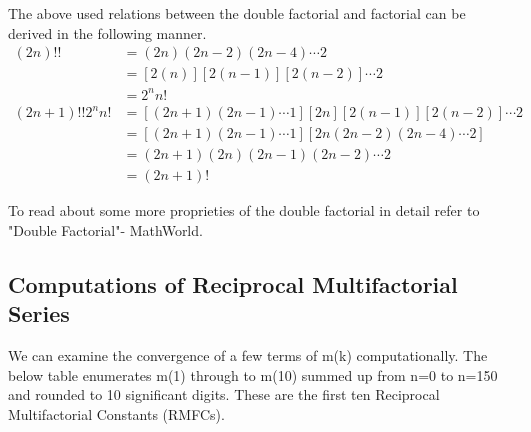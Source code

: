 \documentclass[12pt]{article}
\numberwithin{equation}{section}
\newcommand{\QED}{\tag*{$\square$}}
\begin{document}
\par
The above used relations between the double factorial and factorial can be derived in the following manner.
\begin{align*}
    (2n)!!&=(2n)(2n-2)(2n-4) \cdots 2\\
    &=[2(n)][2(n-1)][2(n-2)] \cdots 2\\
    &= 2^n n! \QED \\
    (2n+1)!!2^n n! &=[(2n+1)(2n-1)\cdots 1][2n][2(n-1)][2(n-2)]\cdots2\\
    &=[(2n+1)(2n-1) \cdots 1] [2n(2n-2)(2n-4) \cdots 2]\\
    &=(2n+1)(2n)(2n-1)(2n-2)\cdots 2\\
    &=(2n+1)!
    \QED
\end{align*}
\par To read about some more proprieties of the double factorial in detail refer to "Double Factorial"- MathWorld.\cite{doublefactorial}
\subsection{Computations of Reciprocal Multifactorial Series}
We can examine the convergence of a few terms of m(k) computationally. The below table enumerates m(1) through to m(10) summed up from n=0 to n=150 and rounded to 10 significant digits. These are the first ten Reciprocal Multifactorial Constants (RMFCs).
\end{document}
